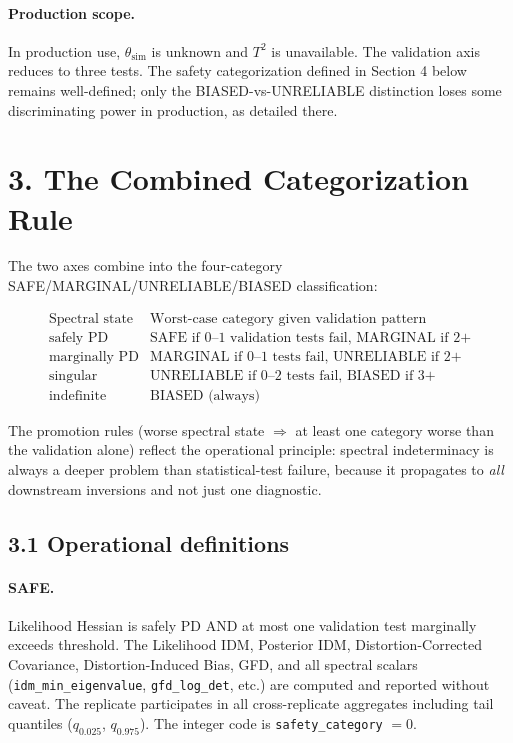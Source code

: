 \documentclass[11pt]{article}
\begin{document}
\paragraph{Production scope.}
In production use, $\theta_{\mathrm{sim}}$ is unknown and $T^2$ is
unavailable. The validation axis reduces to three tests. The safety
categorization defined in Section 4 below remains well-defined; only
the BIASED-vs-UNRELIABLE distinction loses some discriminating power
in production, as detailed there.

\section*{3. The Combined Categorization Rule}
\label{sec:sc-combined-rule}

The two axes combine into the four-category SAFE/MARGINAL/UNRELIABLE/BIASED
classification:

\begin{equation}
\boxed{\quad
\begin{array}{l|l}
\text{Spectral state} & \text{Worst-case category given validation pattern} \\
\hline
\text{safely PD} & \text{SAFE if 0--1 validation tests fail, MARGINAL if 2+} \\
\text{marginally PD} & \text{MARGINAL if 0--1 tests fail, UNRELIABLE if 2+} \\
\text{singular} & \text{UNRELIABLE if 0--2 tests fail, BIASED if 3+} \\
\text{indefinite} & \text{BIASED (always)}
\end{array}
\quad}
\label{eq:sc-combined-rule}
\end{equation}

The promotion rules (worse spectral state $\Longrightarrow$ at least
one category worse than the validation alone) reflect the
operational principle: spectral indeterminacy is always a deeper
problem than statistical-test failure, because it propagates to
\emph{all} downstream inversions and not just one diagnostic.

\subsection*{3.1 Operational definitions}

\paragraph{SAFE.} Likelihood Hessian is safely PD AND at most one
validation test marginally exceeds threshold. The Likelihood IDM,
Posterior IDM, Distortion-Corrected Covariance, Distortion-Induced
Bias, GFD, and all spectral scalars (\texttt{idm\_min\_eigenvalue},
\texttt{gfd\_log\_det}, etc.) are computed and reported without
caveat. The replicate participates in all cross-replicate aggregates
including tail quantiles ($q_{0.025}$, $q_{0.975}$). The integer
code is \texttt{safety\_category} $= 0$.
\end{document}
